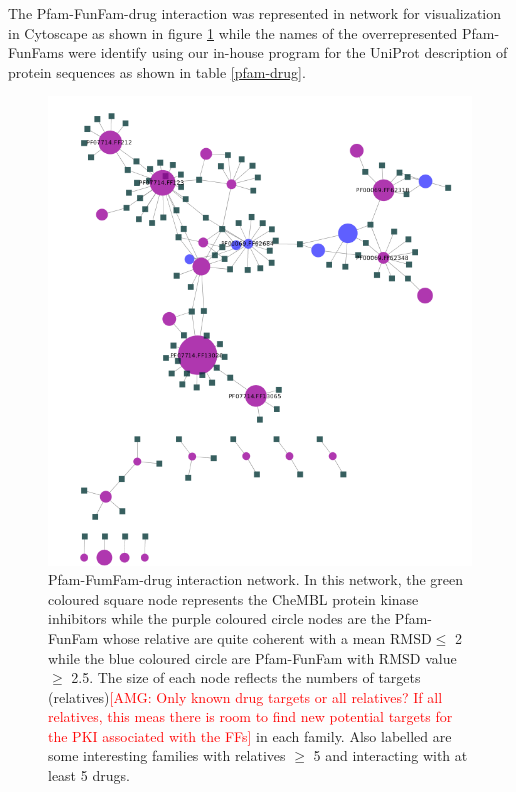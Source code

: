 \documentclass[a4paper, 11pt]{article}
\newcommand{\redcomment}[1]{\textcolor{red}{[#1]}} %
\begin{document}
The Pfam-FunFam-drug interaction was represented in network for visualization in Cytoscape as shown in figure \ref{pfam-chembl} while the names of the overrepresented Pfam-FunFams were identify using our in-house program for the UniProt description  of protein sequences as shown in table \ref{pfam-drug}.
\begin{figure}[H]
	\includegraphics[width=.9\linewidth]{figures/pfam_chembl.png}
	\centering
	\caption{Pfam-FumFam-drug interaction network. In this network, the green coloured square node represents the CheMBL protein kinase inhibitors while the purple coloured circle nodes are the Pfam-FunFam whose relative are quite coherent with a mean RMSD$\leq$ 2 while the blue coloured circle are Pfam-FunFam with RMSD value $\geq$ 2.5. The size of each node reflects the numbers of targets (relatives)\redcomment{AMG: Only known drug targets or all relatives? If all relatives, this meas there is room to find new potential targets for the PKI associated with the FFs} in each family. Also labelled are some interesting families with relatives  $\geq$ 5 and interacting with at least 5 drugs.}
	\label{pfam-chembl}
\end{figure}
\end{document}
